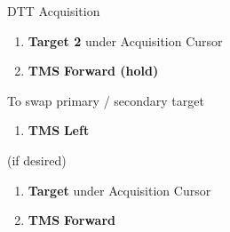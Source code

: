 \begin{checklistenumerate}
{
        \caption{DTT Acquisition}
    }
    \begin{enumerate}
        \item \textbf{Target 2} \dotfill under Acquisition Cursor
        \item \textbf{TMS} \dotfill \textbf{Forward (hold)}
    \end{enumerate}

    To swap primary / secondary target

    \begin{enumerate}[start=3]
        \item \textbf{TMS} \dotfill \textbf{Left}
    \end{enumerate}
     (if desired)
    \begin{enumerate}
        \item \textbf{Target} \dotfill under Acquisition Cursor
        \item \textbf{TMS} \dotfill \textbf{Forward}
    \end{enumerate}
\end{checklistenumerate}

